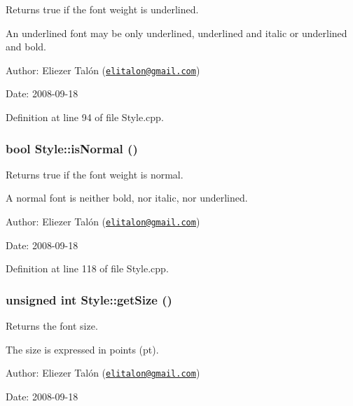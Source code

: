 Returns true if the font weight is underlined. 

An underlined font may be only underlined, underlined and italic or underlined and bold.

\begin{Desc}
\item[Author:]Eliezer Talón (\href{mailto:elitalon@gmail.com}{\tt elitalon@gmail.com}) \end{Desc}
\begin{Desc}
\item[Date:]2008-09-18 \end{Desc}


Definition at line 94 of file Style.cpp.\hypertarget{class_style_07721a2c2c852f4281368731d22d74b7}{
\subsubsection[isNormal]{\setlength{\rightskip}{0pt plus 5cm}bool Style::isNormal ()}}
\label{class_style_07721a2c2c852f4281368731d22d74b7}


Returns true if the font weight is normal. 

A normal font is neither bold, nor italic, nor underlined.

\begin{Desc}
\item[Author:]Eliezer Talón (\href{mailto:elitalon@gmail.com}{\tt elitalon@gmail.com}) \end{Desc}
\begin{Desc}
\item[Date:]2008-09-18 \end{Desc}


Definition at line 118 of file Style.cpp.\hypertarget{class_style_7797f0204f6af51911d887f970d9fbeb}{
\subsubsection[getSize]{\setlength{\rightskip}{0pt plus 5cm}unsigned int Style::getSize ()}}
\label{class_style_7797f0204f6af51911d887f970d9fbeb}


Returns the font size. 

The size is expressed in points (pt).

\begin{Desc}
\item[Author:]Eliezer Talón (\href{mailto:elitalon@gmail.com}{\tt elitalon@gmail.com}) \end{Desc}
\begin{Desc}
\item[Date:]2008-09-18 \end{Desc}



